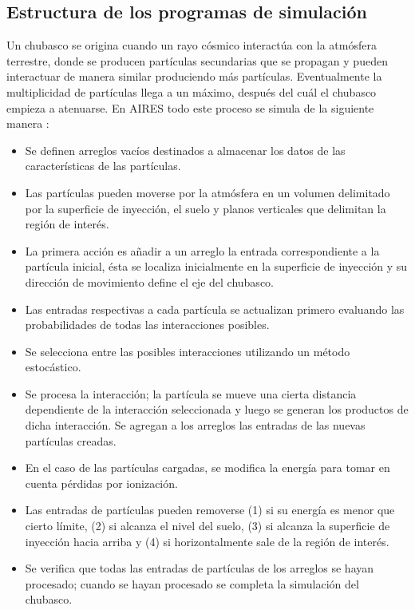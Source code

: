	\subsection{Estructura de los programas de simulación}
	Un chubasco se origina cuando un rayo cósmico interactúa con la atmósfera terrestre, donde se producen partículas secundarias que se propagan y pueden interactuar de manera similar produciendo más partículas. Eventualmente la multiplicidad de partículas llega a un máximo, después del cuál el chubasco empieza a atenuarse. En AIRES todo este proceso se simula de la siguiente manera \cite{Sciutto2002}:
	\begin{itemize}
	\item Se definen arreglos vacíos destinados a almacenar los datos de las características de las partículas.
	\item Las partículas pueden moverse por la atmósfera en un volumen delimitado por la superficie de inyección, el suelo y planos verticales que delimitan la región de interés.
	\item La primera acción es añadir a un arreglo la entrada correspondiente a la partícula inicial, ésta se localiza inicialmente en la superficie de inyección y su dirección de movimiento define el eje del chubasco.
	\item Las entradas respectivas a cada partícula se actualizan primero evaluando las probabilidades de todas las interacciones posibles.
	\item Se selecciona entre las posibles interacciones utilizando un método estocástico.
	\item Se procesa la interacción; la partícula se mueve una cierta distancia dependiente de la interacción seleccionada y luego se generan los productos de dicha interacción. Se agregan a los arreglos las entradas de las nuevas partículas creadas.
	\item En el caso de las partículas cargadas, se modifica la energía para tomar en cuenta pérdidas por ionización.
	\item Las entradas de partículas pueden removerse (1) si su energía es menor que cierto límite, (2) si alcanza el nivel del suelo, (3) si alcanza la superficie de inyección hacia arriba y (4) si horizontalmente sale de la región de interés.
	\item Se verifica que todas las entradas de partículas de los arreglos se hayan procesado; cuando se hayan procesado se completa la simulación del chubasco.
	\end{itemize}	
	
